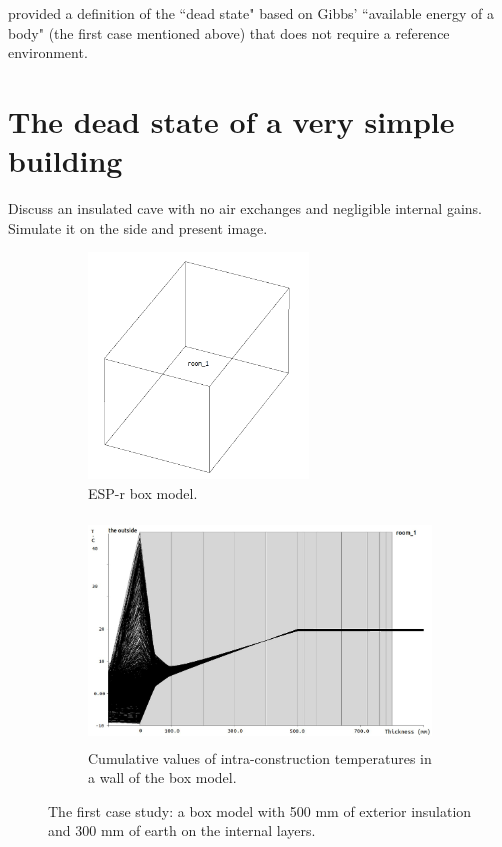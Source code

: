 \documentclass[10pt]{extarticle} %
\begin{document}
\cite{Gaggioli2012} provided a definition of the ``dead state" based on Gibbs' ``available energy of a body" (the first case mentioned above)  that does not require a reference environment. 

\vfill \break

\section{The dead state of a very simple building} \label{subsec:simple}

Discuss an insulated cave with no air exchanges and negligible internal gains. Simulate it on the side and present image.


 
\begin{figure}[h]
 
\begin{subfigure}{0.35\textwidth}
\includegraphics[width=0.95\linewidth, height=6cm]{images/Dead02_boxModel.png} 
\caption{ESP-r box model.}
\label{fig:esprmodel}
\end{subfigure}
\begin{subfigure}{0.65\textwidth}
\includegraphics[width=0.95\linewidth, height=6cm]{images/01Feb_28Feb_Wall1_dead02_krita.jpg}
\caption{Cumulative values of intra-construction temperatures in a wall of the box model.}
\label{fig:constructionelements}
\end{subfigure}
 
\caption{The first case study: a box model with 500 mm of exterior  insulation and 300 mm of earth on the internal layers.}
\label{fig:casestudy}
\end{figure}
\end{document}
